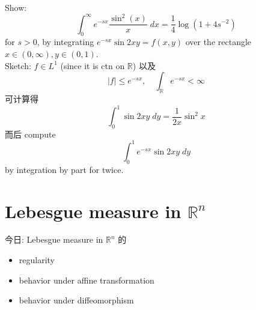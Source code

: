 \documentclass[lang=cn,11pt]{elegantbook}
\begin{document}
\begin{example}
    Show: \[
    \int_0^\infty e^{-sx} \frac{\sin^2(x)}{x} \; dx = \frac{1}{4} \log(1+ 4s^{-2})
    \]
for $s > 0$, by integrating $e^{-sx} \sin 2xy = f(x,y)$ over the rectangle $x \in (0,\infty), y \in (0,1)$.\\
Sketch: $f \in L^1$ (since it is ctn on $\mathbb{R}$)
以及 \[
|f| \leq e^{-sx}, \quad \int_{\mathbb{R}} e^{-sx} < \infty
\]
可计算得 \[
\int_0 ^1 \sin 2xy \; dy = \frac{1}{2x} \sin^2 x
\]
而后 compute \[
\int_0 ^1    e^{-sx} \sin 2xy \; dy
\] by integration by part for twice.
\end{example}












\chapter{Lebesgue measure in $\mathbb{R}^n$}
今日: Lebesgue measure in $\mathbb{R}^n$ 的 \begin{itemize}
    \item regularity
    \item behavior under affine transformation
    \item behavior under diffeomorphism
\end{itemize}
\end{document}
